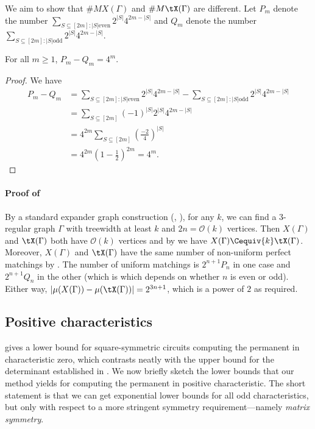\documentclass{toc}
\begin{document}
We aim to show that $\# M X(\Gamma)$ and $\# M \tX(\Gamma)$ are different.  Let $P_m$
denote the number $\sum_{S\subseteq [2m] : |S| \text{even}} 2^{|S|}4^{2m-|S|}$
and $Q_m$ denote the number $\sum_{S\subseteq [2m] : |S| \text{odd}}
2^{|S|}4^{2m-|S|}$.
\begin{lemma}\label{lem:pandq}
  For all $m \geq 1$, $P_m - Q_m = 4^m$.
\end{lemma}
\begin{proof}
  We have
  \begin{align*}
    P_m - Q_m & = \sum_{S\subseteq [2m] : |S| \text{even}} 2^{|S|}4^{2m-|S|} - \sum_{S\subseteq [2m] : |S| \text{odd}} 2^{|S|}4^{2m-|S|} \\
              & = \sum_{S \subseteq [2m]} (-1)^{|S|} 2^{|S|}4^{2m-|S|} \\
              & = 4^{2m} \sum_{S \subseteq [2m]}(\frac{-2}{4})^{|S|} \\
    & = 4^{2m}(1-\frac{1}{2})^{2m} = 4^m.
  \end{align*}
  
\end{proof}

\paragraph{Proof of }
By a standard expander graph construction (\eg, \cite{Ajtai94}), for any $k$, we
can find a $3$-regular graph $\Gamma$ with treewidth at least $k$ and $2n =
\mathcal{O}(k)$ vertices. Then $X(\Gamma)$ and $\tX(\Gamma)$ both have $\mathcal{O}(k)$
vertices and by  we have $X(\Gamma) \Cequiv{k} \tX(\Gamma)$. Moreover,
$X(\Gamma)$ and $\tX(\Gamma)$ have the same number of non-uniform perfect matchings by
. The number of uniform matchings is $2^{n+1}P_n$ in
one case and $2^{n+1}Q_n$ in the other (which is which depends on whether $n$ is
even or odd). Either way, $ |\mu(X(\Gamma)) - \mu(\tX(\Gamma))| = 2^{3n+1}$, which is a
power of $2$ as required.

\subsection{Positive characteristics}\label{sec:positive-char}


 gives a lower bound for
square-symmetric %
%
circuits computing the permanent in characteristic zero, which contrasts neatly with the upper bound for the determinant established in .  We now briefly sketch the lower bounds that our method yields for computing the permanent in positive characteristic.  The short statement is that we can get exponential lower bounds for all odd characteristics, but only with respect to a more stringent symmetry requirement---namely \emph{matrix symmetry}.
\end{document}
